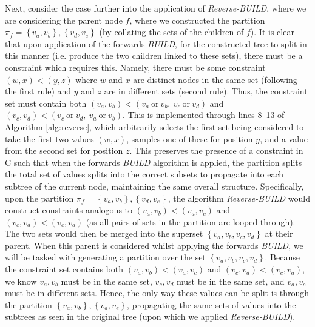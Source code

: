 \documentclass[a4paper, 11pt]{article}
\begin{document}
	Next, consider the case further into the application of \emph{Reverse-BUILD}, where we are considering the parent node $f$, where we constructed the partition $\pi_{f} = \left\{v_{a}, v_{b}\right\},  \left\{v_{d}, v_{e}\right\}$ (by collating the sets of the children of $f$). It is clear that upon application of the forwards \emph{BUILD}, for the constructed tree to split in this manner (i.e. produce the two children linked to these sets), there must be a constraint which requires this. Namely, there must be some constraint $(w, x) < (y, z)$ where $w$ and $x$ are distinct nodes in the same set (following the first rule) and $y$ and $z$ are in different sets (second rule). Thus, the constraint set must contain both $(v_{a}, v_{b}) < (v_{a}~\text{or}~v_{b},~v_{c}~\text{or}~v_{d})$ and $(v_{c}, v_{d}) < (v_{c}~\text{or}~v_{d},~v_{a}~\text{or}~v_{b})$. This is implemented through lines 8--13 of Algorithm \ref{alg:reverse}, which arbitrarily selects the first set being considered to take the first two values $(w, x)$, samples one of these for position $y$, and a value from the second set for position $z$. This preserves the presence of a constraint in C such that when the forwards \emph{BUILD} algorithm is applied, the partition splits the total set of values splits into the correct subsets to propagate into each subtree of the current node, maintaining the same overall structure. Specifically, upon the partition $\pi_{f} = \left\{v_{a}, v_{b}\right\},  \left\{v_{d}, v_{e}\right\}$, the algorithm \emph{Reverse-BUILD} would construct constraints analogous to $(v_{a}, v_{b}) < (v_{a}, v_{c})$ and $(v_{c}, v_{d}) < (v_{c}, v_{a})$ (as all pairs of sets in the partition are looped through). The two sets would then be merged into the superset $\left\{v_{a}, v_{b}, v_{c}, v_{d}\right\}$ at their parent. When this parent is considered whilst applying the forwards \emph{BUILD}, we will be tasked with generating a partition over the set $\left\{v_{a}, v_{b}, v_{c}, v_{d}\right\}$. Because the constraint set contains both $(v_{a}, v_{b}) < (v_{a}, v_{c})$ and $(v_{c}, v_{d}) < (v_{c}, v_{a})$, we know $v_{a}, v_{b}$ must be in the same set,  $v_{c}, v_{d}$ must be in the same set, and $v_{a}, v_{c}$ must be in different sets. Hence, the only way these values can be split is through the partition $\left\{v_{a}, v_{b}\right\},  \left\{v_{d}, v_{e}\right\}$, propagating the same sets of values into the subtrees as seen in the original tree (upon which we applied \emph{Reverse-BUILD}).
	
\end{document}
